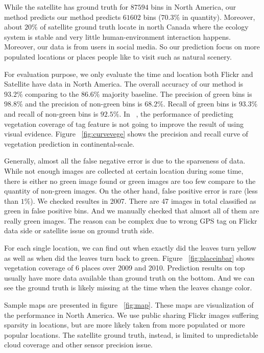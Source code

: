 While the satellite has ground truth for $87594$ bins in North
America, our method predicts our method predicts $61602$ bins
($70.3\%$ in quantity). Moreover, about $20\%$ of satellite ground
truth locate in north Canada where the ecology system is stable and
very little human-environment interaction happens. Moreover, our data
is from users in social media.  So our prediction focus on more
populated locations or places people like to visit such as natural
scenery.

For evaluation purpose, we only evaluate the time and location both
Flickr and Satellite have data in North America. The overall accuracy
of our method is $93.2\%$ comparing to the $86.6\%$ majority baseline.
The precision of green bins is $98.8\%$ and the precision of non-green
bins is $68.2\%$. Recall of green bins is $93.3\%$ and recall of
non-green bins is $92.5\%$. In ~\cite{ecology2012www}, the performance
of predicting vegetation coverage of tag feature is not going to
improve the result of using visual evidence. Figure
~\ref{fig:curvevege} shows the precision and recall curve of
vegetation prediction in continental-scale.

Generally, almost all the false negative error is due to the
sparseness of data.  While not enough images are collected at certain
location during some time, there is either no green image found or
green images are too few compare to the quantity of non-green
images. On the other hand, false positive error is rare (less than
$1\%$). We checked resultes in 2007. There are 47 images in total
classified as green in false positive bins. And we manually checked
that almost all of them are really green images. The reason can be
complex due to wrong GPS tag on Flickr data side or satellite issue on
ground truth side.


 For each single location,
we can find out when exactly did the leaves turn yellow as well as
when did the leaves turn back to green.  Figure ~\ref{fig:placeinbar}
shows vegetation coverage of 6 places over 2009 and 2010.  Prediction
results on top usually have more data available than ground truth on
the bottom.  And we can see the ground truth is likely missing at the
time when the leaves change color.



  Sample maps are presented in figure
~\ref{fig:map}. These maps are visualization of the performance in
North America.  We use public sharing Flickr images suffering sparsity
in locations, but are more likely taken from more populated or more
popular locations.  The satellite ground truth, instead, is limited to
unpredictable cloud coverage and other sensor precision issue.




